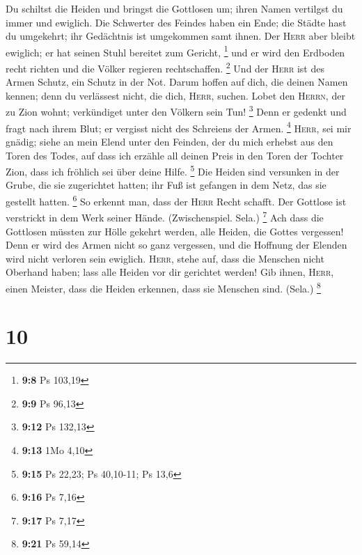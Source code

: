  Du schiltst die Heiden und bringst die Gottlosen um;
ihren Namen vertilgst du immer und ewiglich.  Die
Schwerter des Feindes haben ein Ende; die Städte hast du umgekehrt; ihr
Gedächtnis ist umgekommen samt ihnen.  Der \textsc{Herr}
aber bleibt ewiglich; er hat seinen Stuhl bereitet zum Gericht,
\footnote{\textbf{9:8} Ps 103,19}  und er wird den
Erdboden recht richten und die Völker regieren rechtschaffen.
\footnote{\textbf{9:9} Ps 96,13}  Und der \textsc{Herr}
ist des Armen Schutz, ein Schutz in der Not.  Darum
hoffen auf dich, die deinen Namen kennen; denn du verlässest nicht, die
dich, \textsc{Herr}, suchen.  Lobet den \textsc{Herrn},
der zu Zion wohnt; verkündiget unter den Völkern sein Tun! \footnote{\textbf{9:12}
  Ps 132,13}  Denn er gedenkt und fragt nach ihrem Blut;
er vergisst nicht des Schreiens der Armen. \footnote{\textbf{9:13} 1Mo
  4,10}  \textsc{Herr}, sei mir gnädig; siehe an mein
Elend unter den Feinden, der du mich erhebst aus den Toren des Todes,
 auf dass ich erzähle all deinen Preis in den Toren der
Tochter Zion, dass ich fröhlich sei über deine Hilfe. \footnote{\textbf{9:15}
  Ps 22,23; Ps 40,10-11; Ps 13,6}  Die Heiden sind
versunken in der Grube, die sie zugerichtet hatten; ihr Fuß ist gefangen
in dem Netz, das sie gestellt hatten. \footnote{\textbf{9:16} Ps 7,16}
 So erkennt man, dass der \textsc{Herr} Recht schafft.
Der Gottlose ist verstrickt in dem Werk seiner Hände. (Zwischenspiel.
Sela.) \footnote{\textbf{9:17} Ps 7,17}  Ach dass die
Gottlosen müssten zur Hölle gekehrt werden, alle Heiden, die Gottes
vergessen!  Denn er wird des Armen nicht so ganz
vergessen, und die Hoffnung der Elenden wird nicht verloren sein
ewiglich.  \textsc{Herr}, stehe auf, dass die Menschen
nicht Oberhand haben; lass alle Heiden vor dir gerichtet werden!
 Gib ihnen, \textsc{Herr}, einen Meister, dass die Heiden
erkennen, dass sie Menschen sind. (Sela.) \footnote{\textbf{9:21} Ps
  59,14}

\hypertarget{section-5}{%
\section{10}\label{section-5}}

